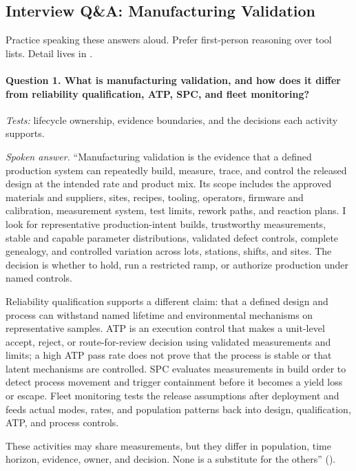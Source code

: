\subsection{Interview Q\&A: Manufacturing Validation}
\label{sec:manufacturing-interview-qa}

Practice speaking these answers aloud. Prefer first-person reasoning over tool
lists. Detail lives in
.

\paragraph{Question 1. What is manufacturing validation, and how does it differ
from reliability qualification, ATP, SPC, and fleet monitoring?}
\textit{Tests:} lifecycle ownership, evidence boundaries, and the decisions
each activity supports.

\textit{Spoken answer.}
``Manufacturing validation is the evidence that a defined production system can
repeatedly build, measure, trace, and control the released design at the
intended rate and product mix. Its scope includes the approved materials and
suppliers, sites, recipes, tooling, operators, firmware and calibration,
measurement system, test limits, rework paths, and reaction plans. I look for
representative production-intent builds, trustworthy measurements, stable and
capable parameter distributions, validated defect controls, complete
genealogy, and controlled variation across lots, stations, shifts, and sites.
The decision is whether to hold, run a restricted ramp, or authorize production
under named controls.

Reliability qualification supports a different claim: that a defined design
and process can withstand named lifetime and environmental mechanisms on
representative samples. ATP is an execution control that makes a unit-level
accept, reject, or route-for-review decision using validated measurements and
limits; a high ATP pass rate does not prove that the process is stable or that
latent mechanisms are controlled. SPC evaluates measurements in build order to
detect process movement and trigger containment before it becomes a yield loss
or escape. Fleet monitoring tests the release assumptions after deployment and
feeds actual modes, rates, and population patterns back into design,
qualification, ATP, and process controls.

These activities may share measurements, but they differ in population, time
horizon, evidence, owner, and decision. None is a substitute for the others''
().

